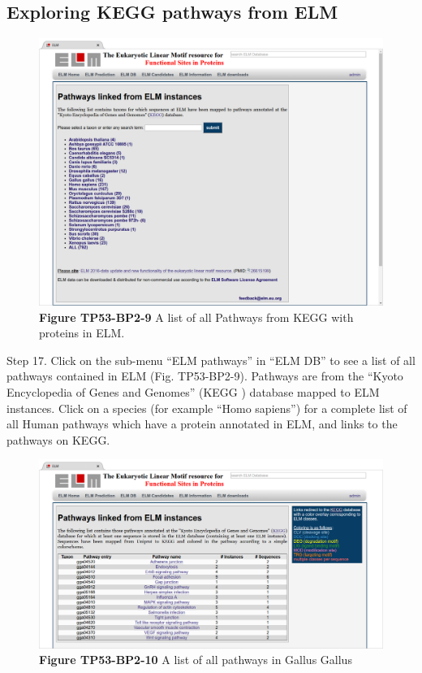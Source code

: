 
\subsection{Exploring KEGG pathways from
ELM}\label{exploring-kegg-pathways-from-elm}

\begin{figure}[h!]
\centering
\includegraphics[width=\textwidth]{Figures/TP53_2/pathways.png} 
\caption{
\textbf{Figure TP53-BP2-9}
A list of all Pathways from KEGG with proteins in ELM.
}
\end{figure}

Step 17. Click on the sub-menu ``ELM pathways'' in ``ELM DB'' to see a
list of all pathways contained in ELM (Fig. TP53-BP2-9). Pathways are
from the ``Kyoto Encyclopedia of Genes and Genomes'' (KEGG
\cite{26476454}) database mapped to ELM instances. Click on a species
(for example ``Homo sapiens'') for a complete list of all Human pathways
which have a protein annotated in ELM, and links to the pathways on
KEGG.

\begin{figure}[h!]
\centering
\includegraphics[width=\textwidth]{Figures/TP53_2/pathways_example.png} 
\caption{
\textbf{Figure TP53-BP2-10}
A list of all pathways in Gallus Gallus
}
\end{figure}

